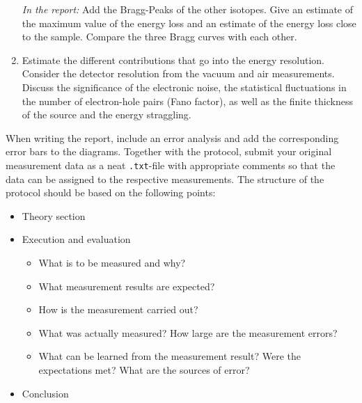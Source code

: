 \begin{enumerate}[label=\textbf{\alph*)}]
	\textit{In the report:} Add the Bragg-Peaks of the other isotopes. Give an estimate of the maximum value of the energy loss and an estimate of the energy loss close to the sample. Compare the three Bragg curves with each other.
	\item Estimate the different contributions that go into the energy resolution. Consider the detector resolution from the vacuum and air measurements. Discuss the significance of the electronic noise, the statistical fluctuations in the number of electron-hole pairs (Fano factor), as well as the finite thickness of the source and the energy straggling.
\end{enumerate}

\noindent
When writing the report, include an error analysis and add the corresponding error bars to the diagrams. Together with the protocol, submit your original measurement data as a neat \texttt{.txt}-file with appropriate comments so that the data can be assigned to the respective measurements. The structure of the protocol should be based on the following points:
\begin{itemize}
	\item Theory section
	\item Execution and evaluation
	\begin{itemize}
		\item What is to be measured and why?
		\item What measurement results are expected?
		\item How is the measurement carried out?
		\item What was actually measured? How large are the measurement errors?
		\item What can be learned from the measurement result? Were the expectations met?
		What are the sources of error?
	\end{itemize}
	\item Conclusion
\end{itemize}

